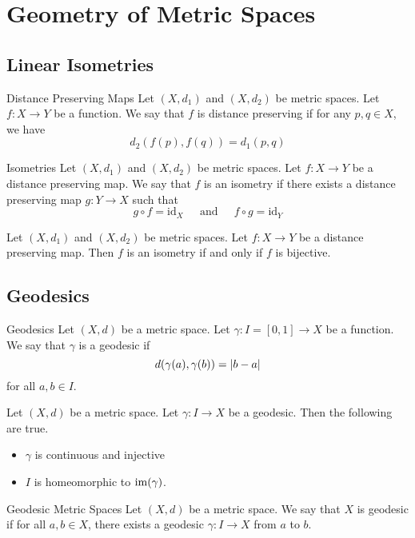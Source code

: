 \documentclass[a4paper]{article}
\begin{document}
\pagebreak
\section{Geometry of Metric Spaces}
\subsection{Linear Isometries}
\begin{defn}{Distance Preserving Maps}{} Let $(X,d_1)$ and $(X,d_2)$ be metric spaces. Let $f:X\to Y$ be a function. We say that $f$ is distance preserving if for any $p,q\in X$, we have $$d_2(f(p),f(q))=d_1(p,q)$$
\end{defn}

\begin{defn}{Isometries}{} Let $(X,d_1)$ and $(X,d_2)$ be metric spaces. Let $f:X\to Y$ be a distance preserving map. We say that $f$ is an isometry if there exists a distance preserving map $g:Y\to X$ such that $$g\circ f=\text{id}_X\;\;\;\;\text{ and }\;\;\;\;f\circ g=\text{id}_Y$$
\end{defn}

\begin{lmm}{}{} Let $(X,d_1)$ and $(X,d_2)$ be metric spaces. Let $f:X\to Y$ be a distance preserving map. Then $f$ is an isometry if and only if $f$ is bijective. 
\end{lmm}

\subsection{Geodesics}
\begin{defn}{Geodesics}{} Let $(X,d)$ be a metric space. Let $\gamma:I=[0,1]\to X$ be a function. We say that $\gamma$ is a geodesic if $$d(\gamma(a),\gamma(b))=\abs{b-a}$$ for all $a,b\in I$. 
\end{defn}

\begin{prp}{}{} Let $(X,d)$ be a metric space. Let $\gamma:I\to X$ be a geodesic. Then the following are true. 
\begin{itemize}
\item $\gamma$ is continuous and injective
\item $I$ is homeomorphic to $\operatorname{im}(\gamma)$. 
\end{itemize}
\end{prp}

\begin{defn}{Geodesic Metric Spaces}{} Let $(X,d)$ be a metric space. We say that $X$ is geodesic if for all $a,b\in X$, there exists a geodesic $\gamma:I\to X$ from $a$ to $b$. 
\end{defn}
\end{document}
